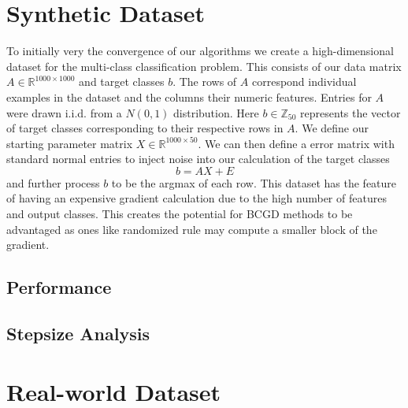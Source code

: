 \documentclass{article}
\begin{document}
\section{Synthetic Dataset}
To initially very the convergence of our algorithms we create a high-dimensional dataset for the multi-class classification problem. This consists of our data matrix $A\in\mathbb{R}^{1000\times1000}$ and target classes $b$. The rows of $A$ correspond individual examples in the dataset and the columns their numeric features. Entries for $A$ were drawn i.i.d. from a $N(0,1)$ distribution. Here $b\in\mathbb{Z}_{50}$ represents the vector of target classes corresponding to their respective rows in $A$. We define our starting parameter matrix $X\in\mathbb{R}^{1000\times50}$. We can then define a error matrix with standard normal entries to inject noise into our calculation of the target classes
$$b = AX + E$$
and further process $b$ to be the argmax of each row. This dataset has the feature of having an expensive gradient calculation due to the high number of features and output classes. This creates the potential for BCGD methods to be advantaged as ones like randomized rule may compute a smaller block of the gradient.
\subsection{Performance}
\subsection{Stepsize Analysis}
\section{Real-world Dataset}
\end{document}

